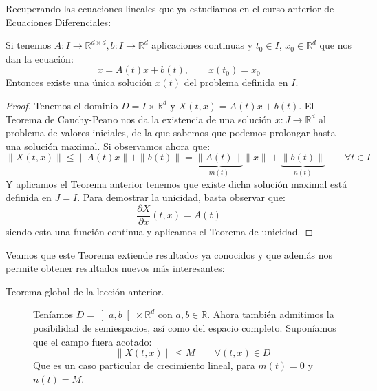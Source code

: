 \noindent
Recuperando las ecuaciones lineales que ya estudiamos en el curso anterior de Ecuaciones Diferenciales:

\begin{coro}
    Si tenemos $A:I\to \mathbb{R}^{d\times d}, b:I\to \mathbb{R}^d$ aplicaciones continuas y $t_0\in I$, $x_0\in \mathbb{R}^d$ que nos dan la ecuación:
    \begin{equation*}
        \dot{x} = A(t) x + b(t), \qquad x(t_0) = x_0
    \end{equation*}
    Entonces existe una única solución $x(t)$ del problema definida en $I$.
    \begin{proof}
        Tenemos el dominio $D = I\times \mathbb{R}^d$ y $X(t,x) = A(t)x + b(t)$. El Teorema de Cauchy-Peano nos da la existencia de una solución $x:J\to \mathbb{R}^d$ al problema de valores iniciales, de la que sabemos que podemos prolongar hasta una solución maximal. Si observamos ahora que:
        \begin{equation*}
            \|X(t,x)\| \leq \|A(t)x\| + \|b(t)\| = \underbrace{\|A(t)\|}_{m(t)}\|x\| + \underbrace{\|b(t)\|}_{n(t)} \qquad \forall t\in I
        \end{equation*}
        Y aplicamos el Teorema anterior tenemos que existe dicha solución maximal está definida en $J = I$. Para demostrar la unicidad, basta observar que:
        \begin{equation*}
            \frac{\partial X}{\partial x}(t,x) = A(t)
        \end{equation*}
        siendo esta una función continua y aplicamos el Teorema de unicidad.
    \end{proof}
\end{coro}

\noindent
Veamos que este Teorema extiende resultados ya conocidos y que además nos permite obtener resultados nuevos más interesantes:
\begin{description}
    \item [Teorema global de la lección anterior.] Teníamos $D=\left]a,b\right[\times \mathbb{R}^d$ con $a,b\in \mathbb{R}$. Ahora también admitimos la posibilidad de semiespacios, así como del espacio completo. Suponíamos que el campo fuera acotado:
        \begin{equation*}
            \|X(t,x)\| \leq M \qquad \forall (t,x)\in D
        \end{equation*}
        Que es un caso particular de crecimiento lineal, para $m(t) = 0$ y $n(t) = M$.
\end{description}

